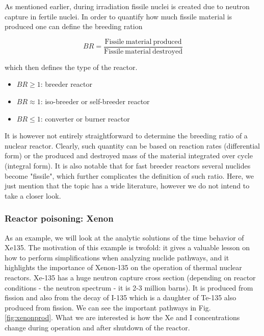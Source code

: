 As mentioned earlier, during irradiation fissile nuclei is created due to neutron capture in fertile nuclei. In order to quantify how much fissile material is produced one can define the breeding ration

\begin{equation*}
        BR=\frac{\mathrm{Fissile\: material\: produced}}{\mathrm{Fissile\: material\: destroyed}}
\end{equation*}

\noindent which then defines the type of the reactor.

\begin{itemize}
\item $BR\geq 1$: breeder reactor   
\item $BR\approx 1$: iso-breeder or self-breeder reactor
\item $BR\leq 1$: converter or burner reactor
\end{itemize}

It is however not entirely straightforward to determine the breeding ratio of a nuclear reactor. Clearly, such quantity can be based on reaction rates (differential form) or the produced and destroyed mass of the material integrated over cycle (integral form). It is also notable that for fast breeder reactors several nuclides become "fissile", which further complicates the definition of such ratio. Here, we just mention that the topic has a wide literature, however we do not intend to take a closer look.


\subsubsection{Reactor poisoning: Xenon}

As an example, we will look at the analytic solutions of the time behavior of Xe135. The motivation of this example is twofold: it gives a valuable lesson on how to perform simplifications when analyzing nuclide pathways, and it highlights the importance of Xenon-135 on the operation of thermal nuclear reactors. Xe-135  has a huge neutron capture cross section (depending on reactor conditions - the neutron spectrum - it is 2-3 million barns). It is produced from fission and also from the decay of I-135 which is a daughter of Te-135 also  produced from fission. We can see the important pathways in Fig. \ref{fig:xenonprod}. What we are interested is how the Xe and I concentrations change during operation and after shutdown of the reactor.

